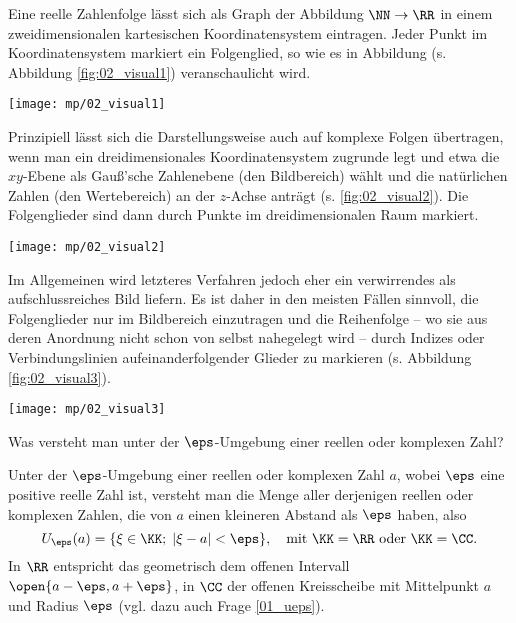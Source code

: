 \begin{antwort}
  Eine reelle Zahlenfolge lässt sich 
  als Graph der Abbildung $\NN\to \RR$ in einem 
  zweidimensionalen kartesischen Koordinatensystem eintragen. 
  Jeder Punkt im Koordinatensystem markiert ein Folgenglied, so wie 
  es in Abbildung (s. Abbildung \ref{fig:02_visual1}) veranschaulicht wird.

  \begin{center}
    \texttt{[image: mp/02\_visual1]}
    \label{fig:02_visual1}
  \end{center}
  
  
  Prinzipiell lässt sich die Darstellungsweise auch auf komplexe Folgen 
  übertragen, wenn man ein dreidimensionales Koordinatensystem zugrunde legt  
  und etwa die $xy$-Ebene als Gauß'sche Zahlenebene (den Bildbereich) 
  wählt und die natürlichen Zahlen (den Wertebereich) an der $z$-Achse 
  anträgt (s. \ref{fig:02_visual2}). 
  Die Folgenglieder sind dann durch Punkte im dreidimensionalen Raum markiert.

  \begin{center}
    \texttt{[image: mp/02\_visual2]}
    \label{fig:02_visual2}
  \end{center}
  
  Im Allgemeinen wird letzteres Verfahren jedoch eher ein verwirrendes 
  als aufschlussreiches Bild liefern. Es ist daher in den meisten 
  Fällen sinnvoll, die Folgenglieder nur im Bildbereich einzutragen 
  und die Reihenfolge -- wo sie 
  aus deren Anordnung nicht schon von selbst nahegelegt wird -- durch Indizes 
  oder Verbindungslinien aufeinanderfolgender Glieder zu markieren (s. Abbildung \ref{fig:02_visual3}).
  \AntEnd

  \begin{center}
    \texttt{[image: mp/02\_visual3]}
    \label{fig:02_visual3}
  \end{center}
\end{antwort}

\begin{frage}%
  \label{02_epsu}
  Was versteht man unter der $\eps$-Umgebung einer reellen oder 
  komplexen Zahl?
\end{frage}

\begin{antwort}
  Unter der $\eps$-Umgebung einer reellen oder komplexen Zahl $a$, 
  wobei $\eps$ eine positive reelle Zahl ist, versteht 
  man die Menge aller derjenigen reellen oder komplexen Zahlen, 
  die von $a$ einen kleineren Abstand als $\eps$ haben, also
  \[
  U_\eps( a) = \{ \xi \in \KK; \; |\xi-a|<\eps \}, \quad 
  \text{mit $\KK=\RR$ oder $\KK=\CC$}.
  \] 
  In $\RR$ entspricht das geometrisch dem offenen 
  Intervall $\open{a-\eps,a+\eps}$, in 
  $\CC$ der offenen Kreisscheibe mit Mittelpunkt $a$ und Radius $\eps$ 
  (vgl. dazu auch Frage \ref{01_ueps}).
  \AntEnd
\end{antwort}




